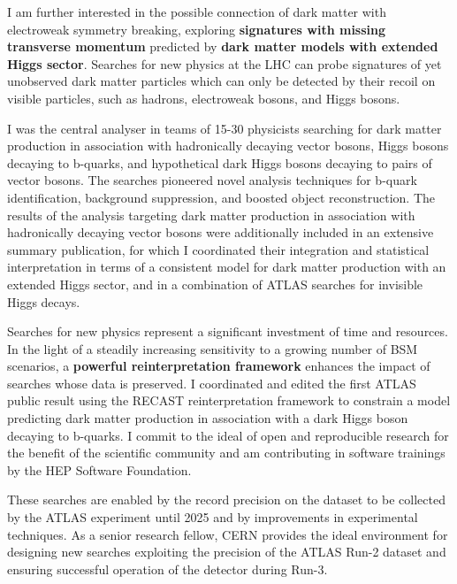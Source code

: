 \documentclass{article}
\begin{document}
\medskip

I am further interested in the possible connection of dark matter with electroweak symmetry breaking, exploring \textbf{signatures with missing transverse momentum} predicted by \textbf{dark matter models with extended Higgs sector}.
Searches for new physics at the LHC can probe signatures of yet unobserved dark matter particles which can only be detected by their recoil on visible particles, such as hadrons, electroweak bosons, and Higgs bosons.

I was the central analyser in teams of 15-30 physicists searching for dark matter production in association with hadronically decaying vector bosons, Higgs bosons decaying to b-quarks, and hypothetical dark Higgs bosons decaying to pairs of vector bosons. The searches pioneered novel analysis techniques for b-quark identification, background suppression, and boosted object reconstruction.
The results of the analysis targeting dark matter production in association with hadronically decaying vector bosons were additionally included in an extensive summary publication, for which I coordinated their integration and statistical interpretation in terms of a consistent model for dark matter production with an extended Higgs sector, and in a combination of ATLAS searches for invisible Higgs decays.
\medskip

Searches for new physics represent a significant investment of time and resources. In the light of a steadily increasing sensitivity to a growing number of BSM scenarios, a \textbf{powerful reinterpretation framework} enhances the impact of searches whose data is preserved. I coordinated and edited the first ATLAS public result using the RECAST reinterpretation framework to constrain a model predicting dark matter production in association with a dark Higgs boson decaying to b-quarks. I commit to the ideal of open and reproducible research for the benefit of the scientific community and am contributing in software trainings by the HEP Software Foundation.

These searches are enabled by the record precision on the dataset to be collected by the ATLAS experiment until 2025 and by improvements in experimental techniques. As a senior research fellow, CERN provides the ideal environment for designing new searches exploiting the precision of the ATLAS Run-2 dataset and ensuring successful operation of the detector during Run-3.

\end{document}
